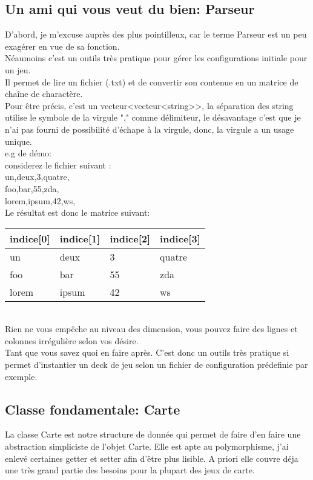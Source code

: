 \documentclass[12pt, letterpaper]{article}
\begin{document}
\subsection{Un ami qui vous veut du bien: Parseur}
D'abord, je m'excuse auprès des plus pointilleux, car le terme Parseur est un peu exagérer en vue de sa fonction.\\
Néaumoins c'est un outils très pratique pour gérer les configurations initiale pour un jeu.\\
Il permet de lire un fichier (.txt) et de convertir son contenue en un matrice de chaîne de charactère.\\
Pour être précis, c'est un vecteur<vecteur<string>>, la séparation des string utilise le symbole de la virgule "," comme délimiteur, 
le désavantage c'est que je n'ai pas fourni de possibilité d'échape à la virgule, donc,
la virgule a un usage unique.\\
e.g de démo: \\
considerez le fichier suivant :\\
un,deux,3,quatre,\\
foo,bar,55,zda,\\
lorem,ipsum,42,ws,\\

Le résultat est donc le matrice suivant:\\
\begin{tabular}{l|l|l|l}
  indice[0]  & indice[1] & indice[2] & indice[3]\\
  \hline  
  un & deux & 3 & quatre\\
  \hline
  foo & bar & 55 & zda\\
  \hline
  lorem & ipsum & 42 & ws\\
\end{tabular}
\\
Rien ne vous empêche au niveau des dimension, vous pouvez faire des lignes et colonnes irrégulière selon vos désire.\\
Tant que vous savez quoi en faire après.
C'est donc un outils très pratique si permet d'instantier un deck de jeu selon un fichier de configuration prédefinie par exemple.


\subsection{Classe fondamentale: Carte}
La classe Carte est notre structure de donnée qui permet de faire d'en faire une abstraction simpliciste de l'objet Carte.
Elle est apte au polymorphisme, j'ai enlevé certaines getter et setter afin d'être plus lisible. 
A priori elle couvre déja une très grand partie des besoins pour la plupart des jeux de carte.\\
\end{document}

